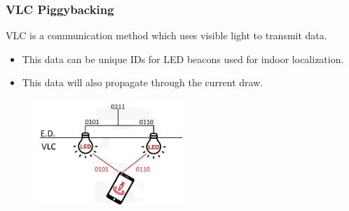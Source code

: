 \documentclass{beamer}
\begin{document}
	\begin{frame}\frametitle{VLC Piggybacking}

		VLC is a communication method which uses visible light to transmit data.

		\begin{itemize}

			\item This data can be unique IDs for LED beacons used for indoor localization.

			\item This data will also propagate through the current draw.


		\end{itemize}


		\begin{figure}
			\centering
			\includegraphics[width=0.5\textwidth]{vlc-indoor-positioning-edit2.jpg}
		\end{figure}





	\end{frame}



\end{document}
